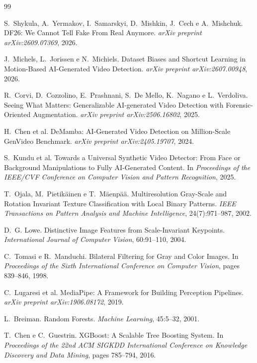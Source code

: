 \documentclass[11pt,a4paper]{article}
\begin{document}
\begin{thebibliography}{99}

S.~Shykula, A.~Yermakov, I.~Samarskyi, D.~Mishkin, J.~Cech e A.~Mishchuk.
\newblock DF26: We Cannot Tell Fake From Real Anymore.
\newblock \emph{arXiv preprint arXiv:2609.07369}, 2026.

J.~Michels, L.~Jorissen e N.~Michiels.
\newblock Dataset Biases and Shortcut Learning in Motion-Based AI-Generated
Video Detection.
\newblock \emph{arXiv preprint arXiv:2607.00948}, 2026.

R.~Corvi, D.~Cozzolino, E.~Prashnani, S.~De Mello, K.~Nagano e L.~Verdoliva.
\newblock Seeing What Matters: Generalizable AI-generated Video Detection with
Forensic-Oriented Augmentation.
\newblock \emph{arXiv preprint arXiv:2506.16802}, 2025.

H.~Chen et al.
\newblock DeMamba: AI-Generated Video Detection on Million-Scale GenVideo
Benchmark.
\newblock \emph{arXiv preprint arXiv:2405.19707}, 2024.

S.~Kundu et al.
\newblock Towards a Universal Synthetic Video Detector: From Face or
Background Manipulations to Fully AI-Generated Content.
\newblock In \emph{Proceedings of the IEEE/CVF Conference on Computer Vision
and Pattern Recognition}, 2025.

T.~Ojala, M.~Pietikäinen e T.~Mäenpää.
\newblock Multiresolution Gray-Scale and Rotation Invariant Texture
Classification with Local Binary Patterns.
\newblock \emph{IEEE Transactions on Pattern Analysis and Machine Intelligence},
24(7):971--987, 2002.

D.~G. Lowe.
\newblock Distinctive Image Features from Scale-Invariant Keypoints.
\newblock \emph{International Journal of Computer Vision}, 60:91--110, 2004.

C.~Tomasi e R.~Manduchi.
\newblock Bilateral Filtering for Gray and Color Images.
\newblock In \emph{Proceedings of the Sixth International Conference on
Computer Vision}, pages 839--846, 1998.

C.~Lugaresi et al.
\newblock MediaPipe: A Framework for Building Perception Pipelines.
\newblock \emph{arXiv preprint arXiv:1906.08172}, 2019.

L.~Breiman.
\newblock Random Forests.
\newblock \emph{Machine Learning}, 45:5--32, 2001.

T.~Chen e C.~Guestrin.
\newblock XGBoost: A Scalable Tree Boosting System.
\newblock In \emph{Proceedings of the 22nd ACM SIGKDD International Conference
on Knowledge Discovery and Data Mining}, pages 785--794, 2016.

\end{thebibliography}
\end{document}
